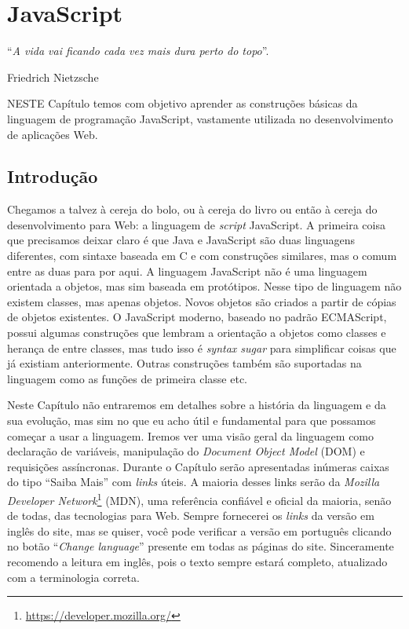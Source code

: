 \chapter{JavaScript}\label{cap:javaScript}
\epigraph{``\textit{A vida vai ficando cada vez mais dura perto do topo}''.}{Friedrich Nietzsche}

\lettrine[lines=4, lhang=0.1, lraise=0, loversize=0.2, findent=0.1em]{\textcolor{corAzulTema}{N}}{ESTE} Capítulo temos com objetivo aprender as construções básicas da linguagem de programação JavaScript, vastamente utilizada no desenvolvimento de aplicações Web.

\section{Introdução}

Chegamos a talvez à cereja do bolo, ou à cereja do livro ou então à cereja do desenvolvimento para Web: a linguagem de \textit{script} JavaScript. A primeira coisa que precisamos deixar claro é que Java e JavaScript são duas linguagens diferentes, com sintaxe baseada em C e com construções similares, mas o comum entre as duas para por aqui. A linguagem JavaScript não é uma linguagem orientada a objetos, mas sim baseada em protótipos. Nesse tipo de linguagem não existem classes, mas apenas objetos. Novos objetos são criados a partir de cópias de objetos existentes. O JavaScript moderno, baseado no padrão ECMAScript, possui algumas construções que lembram a orientação a objetos como classes e herança de entre classes, mas tudo isso é \textit{syntax sugar} para simplificar coisas que já existiam anteriormente. Outras construções também são suportadas na linguagem como as funções de primeira classe etc.

Neste Capítulo não entraremos em detalhes sobre a história da linguagem e da sua evolução, mas sim no que eu acho útil e fundamental para que possamos começar a usar a linguagem. Iremos ver uma visão geral da linguagem como declaração de variáveis, manipulação do \textit{Document Object Model} (DOM) e requisições assíncronas. Durante o Capítulo serão apresentadas inúmeras caixas do tipo ``Saiba Mais'' com \textit{links} úteis. A maioria desses links serão da \textit{Mozilla Developer Network}\footnote{\url{https://developer.mozilla.org/}} (MDN), uma referência confiável e oficial da maioria, senão de todas, das tecnologias para Web. Sempre fornecerei os \textit{links} da versão em inglês do site, mas se quiser, você pode verificar a versão em português clicando no botão ``\textit{Change language}'' presente em todas as páginas do site. Sinceramente recomendo a leitura em inglês, pois o texto sempre estará completo, atualizado com a terminologia correta.

